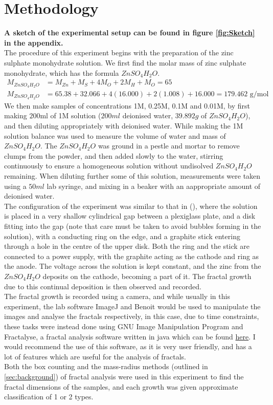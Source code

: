 \documentclass{article}
\theoremstyle{definition}
\theoremstyle{remark}
\begin{document}
\section{Methodology}\label{sec:methodology}
\textbf{A sketch of the experimental setup can be found in figure \ref{fig:Sketch} in the appendix.}\\
The procedure of this experiment begins with the preparation of the zinc sulphate monohydrate solution. We first find the molar mass of zinc sulphate monohydrate, which has the formula $ZnSO_4H_2O$.
\begin{align*}
        M_{ZnSO_4H_2O} &= M_{Zn} + M_{S} + 4M_{O} + 2M_{H} + M_{O} = 65\\
        M_{ZnSO_4H_2O} &= 65.38 + 32.066 + 4(16.000) + 2(1.008) + 16.000 = 179.462\text{ g/mol}
\end{align*}
We then make samples of concentrations 1M, 0.25M, 0.1M and 0.01M, by first making $200$ml of 1M solution ($200ml$ deionised water, $39.892g$ of $ZnSO_4H_2O$), and then diluting appropriately with deionised water.
\indent While making the 1M solution balance was used to measure the volume of water and mass of $ZnSO_4H_2O$. The $ZnSO_4H_2O$ was ground in a pestle and mortar to remove clumps from the powder, and then added slowly to the water, stirring continuously to ensure a homogeneous solution without undisolved $ZnSO_4H_2O$ remaining. When diluting further some of this solution, measurements were taken using a $50ml$ lab syringe, and mixing in a beaker with an aappropriate amount of deionised water.\\
\indent The configuration of the experiment was similar to that in (\cite{PhysRevLett.56.1260}), where the solution is placed in a very shallow cylindrical gap between a plexiglass plate, and a disk fitting into the gap (note that care must be taken to avoid bubbles forming in the solution), with a conducting ring on the edge, and a graphite stick entering through a hole in the centre of the upper disk. Both the ring and the stick are connected to a power supply, with the graphite acting as the cathode and ring as the anode. The voltage across the solution is kept constant, and the zinc from the $ZnSO_4H_2O$ deposits on the cathode, becoming a part of it. The fractal growth due to this continual deposition is then observed and recorded.\\
\indent The fractal growth is recorded using a camera, and while usually in this experiment, the lab software ImageJ and Benoit would be used to manipulate the images and analyse the fractals respectively, in this case, due to time constraints, these tasks were instead done using GNU Image Manipulation Program and Fractalyse, a fractal analysis software written in java which can be found \href{https://sourcesup.renater.fr/www/fractalyse/}{here}. I would recommend the use of this software, as it is very user friendly, and has a lot of features which are useful for the analysis of fractals.\\
\indent Both the box counting and the mass-radius methods (outlined in \ref{sec:background}) of fractal analysis were used in this experiment to find the fractal dimensions of the samples, and each growth was given approximate classification of 1 or 2 types.
\end{document}
